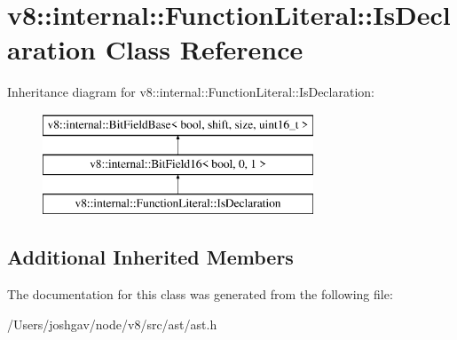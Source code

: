 \hypertarget{classv8_1_1internal_1_1_function_literal_1_1_is_declaration}{}\section{v8\+:\+:internal\+:\+:Function\+Literal\+:\+:Is\+Declaration Class Reference}
\label{classv8_1_1internal_1_1_function_literal_1_1_is_declaration}
Inheritance diagram for v8\+:\+:internal\+:\+:Function\+Literal\+:\+:Is\+Declaration\+:\begin{figure}[H]
\begin{center}
\leavevmode
\includegraphics[height=3.000000cm]{classv8_1_1internal_1_1_function_literal_1_1_is_declaration}
\end{center}
\end{figure}
\subsection*{Additional Inherited Members}


The documentation for this class was generated from the following file\+:\begin{DoxyCompactItemize}
\item 
/\+Users/joshgav/node/v8/src/ast/ast.\+h\end{DoxyCompactItemize}
